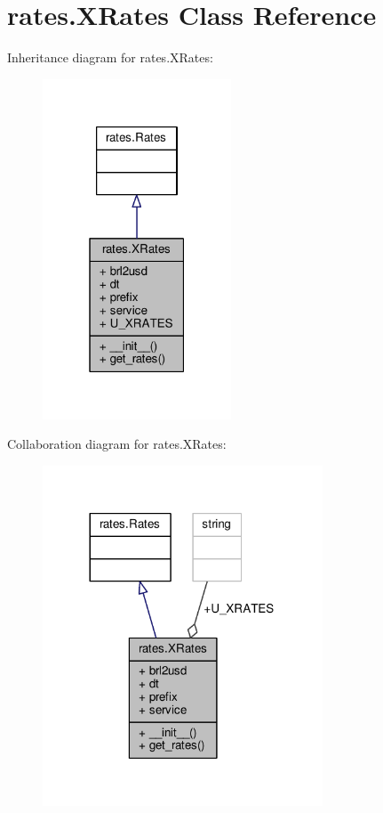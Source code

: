 \hypertarget{classrates_1_1_x_rates}{}\section{rates.\+X\+Rates Class Reference}
\label{classrates_1_1_x_rates}


Inheritance diagram for rates.\+X\+Rates\+:
\nopagebreak
\begin{figure}[H]
\begin{center}
\leavevmode
\includegraphics[width=159pt]{classrates_1_1_x_rates__inherit__graph}
\end{center}
\end{figure}


Collaboration diagram for rates.\+X\+Rates\+:
\nopagebreak
\begin{figure}[H]
\begin{center}
\leavevmode
\includegraphics[width=236pt]{classrates_1_1_x_rates__coll__graph}
\end{center}
\end{figure}
